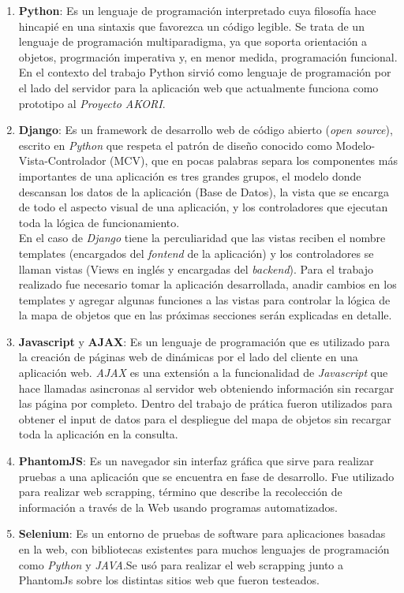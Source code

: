 			\begin{enumerate}
				\item \textbf{Python}: Es un lenguaje de programación interpretado cuya filosofía 
				hace hincapié en una sintaxis que favorezca un código legible. Se trata de un 
				lenguaje de programación multiparadigma, ya que soporta orientación a objetos, 
				progrmación imperativa y, en menor medida, programación funcional. En el contexto 
				del trabajo Python sirvió como lenguaje de programación por el lado del servidor 
				para la aplicación web que actualmente funciona como prototipo al \textit{Proyecto AKORI}. 
				\item \textbf{Django}: Es un framework de desarrollo web de código abierto (\textit{open source}), escrito en \textit{Python} que respeta el patrón de diseño conocido como 
				Modelo-Vista-Controlador (MCV), que en pocas palabras separa los componentes más 
				importantes de una aplicación es tres grandes grupos, el modelo donde descansan los
				datos de la aplicación (Base de Datos), la vista que se encarga de todo el aspecto 
				visual de una aplicación, y los controladores que ejecutan toda la lógica de
				funcionamiento. \\ 
				En el caso de \textit{Django} tiene la perculiaridad que las vistas reciben el 
				nombre templates (encargados del \textit{fontend} de la aplicación) y los 
				controladores se llaman vistas (Views en inglés y encargadas del \textit{backend}). 	
				Para el trabajo realizado fue necesario tomar la aplicación desarrollada, anadir
				cambios en los templates y agregar algunas funciones a las vistas para controlar 
				la lógica de la mapa de objetos que en las próximas secciones serán explicadas en 
				detalle.
				\item \textbf{Javascript} y \textbf{AJAX}: Es un lenguaje de programación que 
				es utilizado para la creación de páginas web de dinámicas por el lado del cliente
				en una aplicación web. \textit{AJAX} es una extensión a la funcionalidad de 
				\textit{Javascript} que hace llamadas asincronas al servidor web obteniendo 
				información sin recargar las página por completo. Dentro del trabajo de prática
				fueron utilizados para obtener el input de datos para el despliegue del mapa de 
				objetos sin recargar toda la aplicación en la consulta. 
				\item \textbf{PhantomJS}: Es un navegador sin interfaz gráfica que sirve para 
				realizar pruebas a una aplicación que se encuentra en fase de desarrollo. Fue 
				utilizado para realizar web scrapping, término que describe la recolección de 
				información a través de la Web usando programas automatizados.
				\item \textbf{Selenium}: Es un entorno de pruebas de software para aplicaciones 
				basadas en la web, con bibliotecas existentes para muchos lenguajes de programación
				como \textit{Python} y \textit{JAVA}.Se usó para realizar el web scrapping 
				junto a PhantomJs sobre los distintas sitios web que fueron testeados.
			\end{enumerate}
